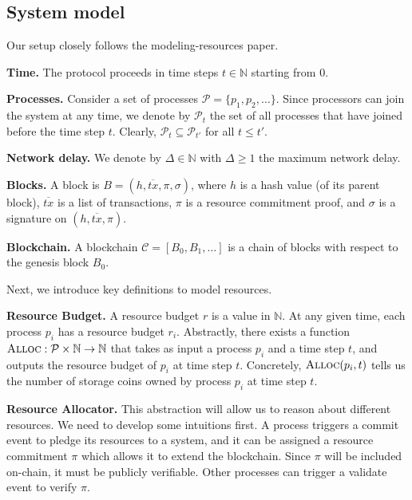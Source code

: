 \documentclass[12pt,draftcls,onecolumn]{IEEEtran}
\newcommand{\Alloc}{\textsc{Alloc}}
\begin{document}
\subsection{System model}







Our setup closely follows the modeling-resources paper.


{\bf Time.} The protocol proceeds in time steps $t \in \mathbb{N}$ starting from $0$.

{\bf Processes.} Consider a set of processes $\mathcal{P} = \{ p_1, p_2, \ldots \}$. Since processors can join the system at any time,
we denote by $\mathcal{P}_t$ the set of all processes that have joined before the time step $t$. Clearly, $\mathcal{P}_t \subseteq \mathcal{P}_{t'}$ 
for all $t \le t'$.

{\bf Network delay.} We denote by $\Delta \in \mathbb{N}$ with $\Delta \ge 1$ the maximum network delay.

{\bf Blocks.} A block is $B = (h, \overline{tx}, \pi, \sigma)$, where $h$ is a hash value (of its parent block), $\overline{tx}$ is a list of transactions,
$\pi$ is a resource commitment proof, and $\sigma$ is a signature on $(h, \overline{tx}, \pi)$.

{\bf Blockchain.} A blockchain $\mathcal{C} = [B_0, B_1, \ldots]$ is a chain of blocks with respect to the genesis block $B_0$.

Next, we introduce key definitions to model resources.

{\bf Resource Budget.} A resource budget $r$ is a value in $\mathbb{N}$. At any given time, each process $p_i$ has a resource budget $r_i$.
Abstractly, there exists a function $\Alloc: \mathcal{P} \times \mathbb{N} \to \mathbb{N}$ that takes as input a process $p_i$
and a time step $t$, and outputs the resource budget of $p_i$ at time step $t$. Concretely, $\Alloc(p_i, t)$ tells us the number of storage coins
owned by process $p_i$ at time step $t$.

{\bf Resource Allocator.} This abstraction will allow us to reason about different resources. We need to develop some intuitions first. 
A process triggers a commit event to pledge its resources to a system, and it can be assigned a resource commitment $\pi$ which allows it to extend the blockchain. Since $\pi$ will be included on-chain, it must be publicly verifiable. Other processes can trigger a validate event to verify $\pi$.
\end{document}
